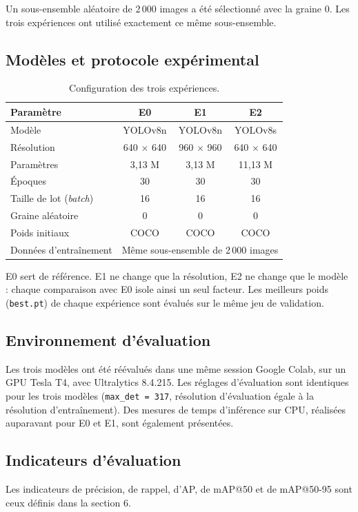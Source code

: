 \documentclass[11pt,a4paper]{article}
\begin{document}
Un sous-ensemble aléatoire de 2\,000 images a été sélectionné avec la graine
0. Les trois expériences ont utilisé exactement ce même sous-ensemble.

\subsection{Modèles et protocole expérimental}
\begin{table}[htbp]
\centering
\small
\begin{tabular}{@{}lccc@{}}
\toprule
Paramètre & E0 & E1 & E2 \\
\midrule
Modèle & YOLOv8n & YOLOv8n & YOLOv8s \\
Résolution & 640 $\times$ 640 & 960 $\times$ 960 & 640 $\times$ 640 \\
Paramètres & 3,13 M & 3,13 M & 11,13 M \\
Époques & 30 & 30 & 30 \\
Taille de lot (\emph{batch}) & 16 & 16 & 16 \\
Graine aléatoire & 0 & 0 & 0 \\
Poids initiaux & COCO & COCO & COCO \\
Données d'entraînement & \multicolumn{3}{c}{Même sous-ensemble de 2\,000 images} \\
\bottomrule
\end{tabular}
\caption{Configuration des trois expériences.}
\label{tab:config}
\end{table}

E0 sert de référence. E1 ne change que la résolution, E2 ne change que le
modèle : chaque comparaison avec E0 isole ainsi un seul facteur. Les
meilleurs poids (\texttt{best.pt}) de chaque expérience sont évalués sur le
même jeu de validation.


\subsection{Environnement d'évaluation}
Les trois modèles ont été réévalués dans une même session Google Colab, sur
un GPU Tesla T4, avec Ultralytics 8.4.215. Les réglages d'évaluation sont
identiques pour les trois modèles (\texttt{max\_det = 317}, résolution
d'évaluation égale à la résolution d'entraînement). Des mesures de temps
d'inférence sur CPU, réalisées auparavant pour E0 et E1, sont également
présentées.

\subsection{Indicateurs d'évaluation}
Les indicateurs de précision, de rappel, d'AP, de mAP@50 et de mAP@50-95
sont ceux définis dans la section 6.
\end{document}

